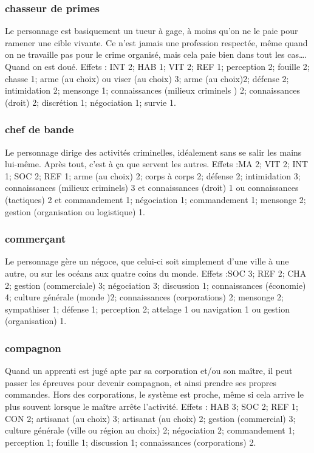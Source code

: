 \documentclass[10pt,a4paper,twocolumn]{book}
\begin{document}
\subsubsection{chasseur de primes}
Le personnage est basiquement un tueur à gage, à moins qu’on ne le paie pour ramener une cible vivante. Ce n’est jamais une profession respectée, même quand on ne travaille pas pour le crime organisé, mais cela paie bien dans tout les cas…. Quand on est doué.
Effets : INT 2; HAB 1; VIT 2; REF 1; perception 2; fouille 2; chasse 1; arme (au choix) ou viser (au choix) 3; arme (au choix)2; défense 2; intimidation 2; mensonge 1; connaissances (milieux criminels ) 2; connaissances (droit) 2; discrétion 1; négociation 1; survie 1.
\subsubsection{chef de bande}
Le personnage dirige des activités criminelles, idéalement sans se salir les mains lui-même. Après tout, c’est à ça que servent les autres. 
Effets :MA 2; VIT 2; INT 1; SOC 2; REF 1; arme (au choix) 2; corps à corps 2; défense 2; intimidation 3; connaissances (milieux criminels) 3 et connaissances (droit) 1 ou connaissances (tactiques) 2 et commandement 1; négociation 1; commandement 1; mensonge 2; gestion (organisation ou logistique) 1.
\subsubsection{commerçant}
Le personnage gère un négoce, que celui-ci soit simplement d’une ville à une autre, ou sur les océans aux quatre coins du monde.
Effets :SOC 3; REF 2; CHA 2; gestion (commerciale) 3; négociation 3; discussion 1; connaissances (économie) 4; culture générale (monde )2; connaissances (corporations) 2; mensonge 2; sympathiser 1; défense 1; perception 2; attelage 1 ou navigation 1 ou gestion (organisation) 1.  

\subsubsection{compagnon}
Quand un apprenti est jugé apte par sa corporation et/ou son maître, il peut passer les épreuves pour devenir compagnon, et ainsi prendre ses propres commandes. Hors des corporations, le système est proche, même si cela arrive le plus souvent lorsque le maître arrête l’activité.
Effets : HAB 3; SOC 2; REF 1; CON 2; artisanat (au choix) 3; artisanat (au choix) 2; gestion (commercial) 3; culture générale (ville ou région au choix) 2; négociation 2; commandement 1; perception 1; fouille 1; discussion 1; connaissances (corporations) 2.
\end{document}
